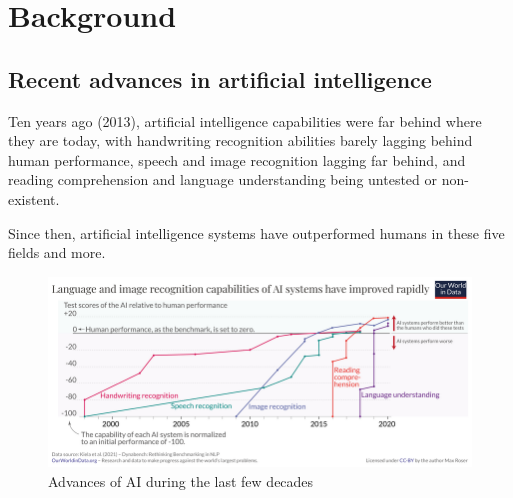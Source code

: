 \documentclass[masterthesis]{fer}
\begin{document}
\chapter{Background}
\section{Recent advances in artificial intelligence}

Ten years ago (2013), artificial intelligence capabilities were far behind where they are today, with handwriting recognition abilities barely lagging behind human performance, speech and image recognition lagging far behind, and reading comprehension and language understanding being untested or non-existent.

Since then, artificial intelligence systems have outperformed humans in these five fields and more.
\cite{owid-brief-history-of-ai}
\begin{figure}[htb]
  \centering
  \includegraphics[width=1\linewidth]{Figures/AI performance history.png} 
  \caption{Advances of AI during the last few decades}
  \label{slk:AI_advances}
\end{figure}
\end{document}
